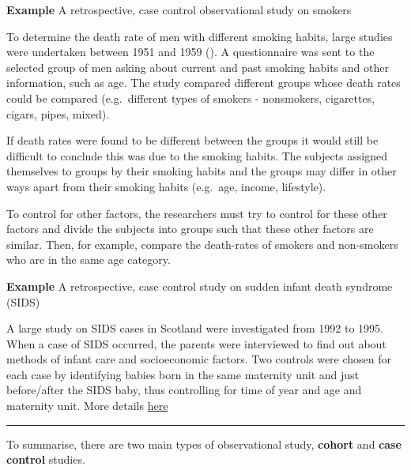 \documentclass[
  oneside]{krantz}
\begin{document}
\textbf{Example} A retrospective, case control observational study on smokers

To determine the death rate of men with different smoking habits, large studies were undertaken between 1951 and 1959 (\citeyearpar{Snedecor&Cochran1980}). A questionnaire was sent to the selected group of men asking about current and past smoking habits and other information, such as age. The study compared different groups whose death rates could be compared (e.g.~different types of smokers - nonsmokers, cigarettes, cigars, pipes, mixed).

If death rates were found to be different between the groups it would still be difficult to conclude this was due to the smoking habits. The subjects assigned themselves to groups by their smoking habits and the groups may differ in other ways apart from their smoking habits (e.g.~age, income, lifestyle).

To control for other factors, the researchers must try to control for these other factors and divide the subjects into groups such that these other factors are similar. Then, for example, compare the death-rates of smokers and non-smokers who are in the same age category.

\textbf{Example} A retrospective, case control study on sudden infant death syndrome (SIDS)

A large study on SIDS cases in Scotland were investigated from 1992 to 1995. When a case of SIDS occurred, the parents were interviewed to find out about methods of infant care and socioeconomic factors. Two controls were chosen for each case by identifying babies born in the same maternity unit and just before/after the SIDS baby, thus controlling for time of year and age and maternity unit. More details \href{http://www.sids-network.org/experts/scottish.htm}{here}

\begin{center}\rule{0.5\linewidth}{0.5pt}\end{center}

To summarise, there are two main types of observational study, \textbf{cohort} and \textbf{case control} studies.
\end{document}
